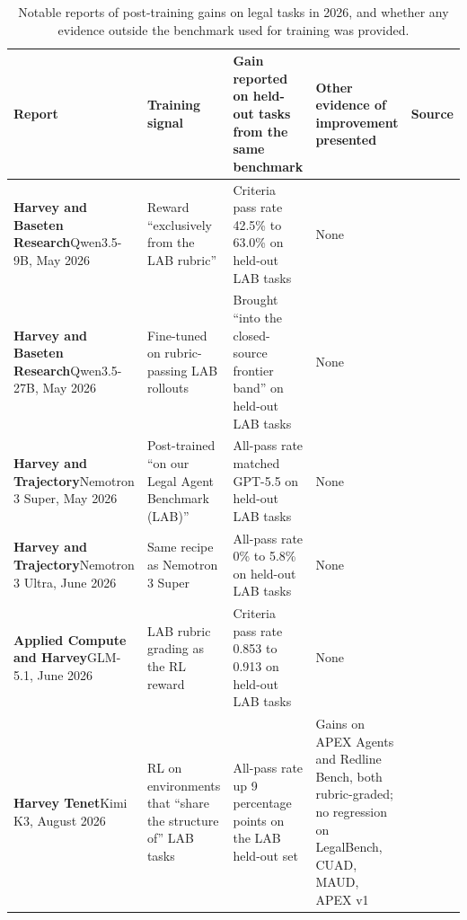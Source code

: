 \documentclass[11pt]{article}
\newcommand{\faintrule}{\arrayrulecolor{black!25}\specialrule{0.3pt}{3pt}{3pt}\arrayrulecolor{black}}
\begin{document}
\begin{table}[htbp]
\centering\small
\caption{Notable reports of post-training gains on legal tasks in 2026, and whether any evidence outside the benchmark used for training was provided.}
\label{tab:same-benchmark}
\setlength{\tabcolsep}{4pt}
\renewcommand{\arraystretch}{1.1}
\begin{tabular}{@{}>{\raggedright\arraybackslash}p{.20\linewidth}>{\raggedright\arraybackslash}p{.23\linewidth}>{\raggedright\arraybackslash}p{.23\linewidth}>{\raggedright\arraybackslash}p{.21\linewidth}>{\raggedright\arraybackslash}p{.06\linewidth}@{}}
\toprule
Report & Training signal & Gain reported on held-out tasks from the same benchmark & Other evidence of improvement presented & Source \\
\midrule
\textbf{Harvey and Baseten Research}\newline Qwen3.5-9B, May 2026 & Reward ``exclusively from the LAB rubric'' & Criteria pass rate 42.5\% to 63.0\% on held-out LAB tasks & None & \citep{harveyBaseten} \\
\faintrule
\textbf{Harvey and Baseten Research}\newline Qwen3.5-27B, May 2026 & Fine-tuned on rubric-passing LAB rollouts & Brought ``into the closed-source frontier band'' on held-out LAB tasks & None & \citep{harveyBaseten} \\
\faintrule
\textbf{Harvey and Trajectory}\newline Nemotron 3 Super, May 2026 & Post-trained ``on our Legal Agent Benchmark (LAB)'' & All-pass rate matched GPT-5.5 on held-out LAB tasks & None & \citep{trajectoryNemotronSuper} \\
\faintrule
\textbf{Harvey and Trajectory}\newline Nemotron 3 Ultra, June 2026 & Same recipe as Nemotron 3 Super & All-pass rate 0\% to 5.8\% on held-out LAB tasks & None & \citep{trajectoryNemotronUltra} \\
\faintrule
\textbf{Applied Compute and Harvey}\newline GLM-5.1, June 2026 & LAB rubric grading as the RL reward & Criteria pass rate 0.853 to 0.913 on held-out LAB tasks & None & \citep{appliedCompute} \\
\faintrule
\textbf{Harvey Tenet}\newline Kimi K3, August 2026 & RL on environments that ``share the structure of'' LAB tasks & All-pass rate up 9 percentage points on the LAB held-out set & Gains on APEX Agents and Redline Bench, both rubric-graded; no regression on LegalBench, CUAD, MAUD, APEX v1 & \citep{harveyTenet} \\

\end{tabular}
\end{table}
\end{document}
